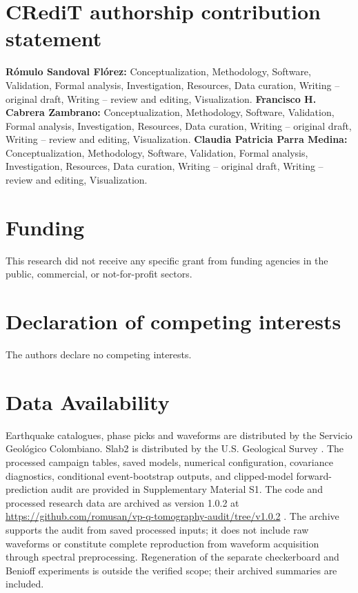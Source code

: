 \documentclass[review,authoryear,longtitle]{elsarticle}
\begin{document}
\section*{CRediT authorship contribution statement}
\textbf{R\'omulo Sandoval Fl\'orez:} Conceptualization, Methodology, Software, Validation, Formal analysis, Investigation, Resources, Data curation, Writing -- original draft, Writing -- review and editing, Visualization.
\textbf{Francisco H. Cabrera Zambrano:} Conceptualization, Methodology, Software, Validation, Formal analysis, Investigation, Resources, Data curation, Writing -- original draft, Writing -- review and editing, Visualization.
\textbf{Claudia Patricia Parra Medina:} Conceptualization, Methodology, Software, Validation, Formal analysis, Investigation, Resources, Data curation, Writing -- original draft, Writing -- review and editing, Visualization.

\section*{Funding}
This research did not receive any specific grant from funding agencies in the public, commercial, or not-for-profit sectors.

\section*{Declaration of competing interests}
The authors declare no competing interests.

\section*{Data Availability}
Earthquake catalogues, phase picks and waveforms are distributed by the Servicio Geol\'ogico Colombiano. Slab2 is distributed by the U.S. Geological Survey \citep{Hayes2018Slab2}. The processed campaign tables, saved models, numerical configuration, covariance diagnostics, conditional event-bootstrap outputs, and clipped-model forward-prediction audit are provided in Supplementary Material S1. The code and processed research data are archived as version 1.0.2 at \url{https://github.com/romusan/vp-q-tomography-audit/tree/v1.0.2} \citep{Sandoval2026VpQArchive}. The archive supports the audit from saved processed inputs; it does not include raw waveforms or constitute complete reproduction from waveform acquisition through spectral preprocessing. Regeneration of the separate checkerboard and Benioff experiments is outside the verified scope; their archived summaries are included.
\end{document}
